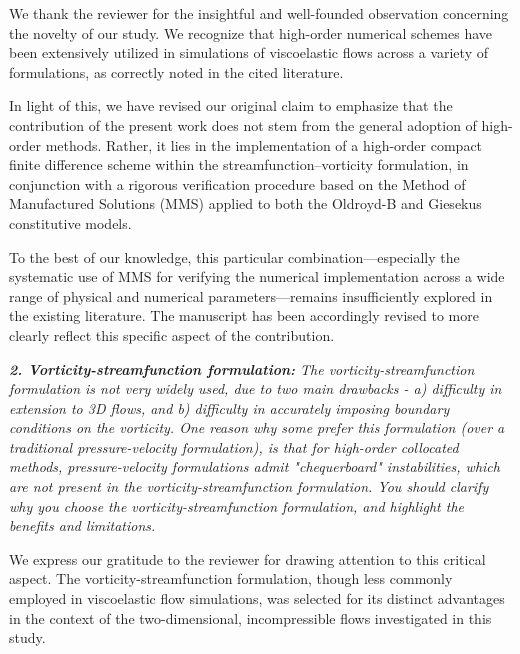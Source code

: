 \documentclass[12pt]{article}
\begin{document}
We thank the reviewer for the insightful and well-founded observation concerning the novelty of our study. We recognize that high-order numerical schemes have been extensively utilized in simulations of viscoelastic flows across a variety of formulations, as correctly noted in the cited literature.

In light of this, we have revised our original claim to emphasize that the contribution of the present work does not stem from the general adoption of high-order methods. Rather, it lies in the implementation of a high-order compact finite difference scheme within the streamfunction–vorticity formulation, in conjunction with a rigorous verification procedure based on the Method of Manufactured Solutions (MMS) applied to both the Oldroyd-B and Giesekus constitutive models.

To the best of our knowledge, this particular combination—especially the systematic use of MMS for verifying the numerical implementation across a wide range of physical and numerical parameters—remains insufficiently explored in the existing literature. The manuscript has been accordingly revised to more clearly reflect this specific aspect of the contribution.

\vspace{3mm}
{\it \textbf{2. Vorticity-streamfunction formulation:} The vorticity-streamfunction formulation is not very widely used, due to two main drawbacks - a) difficulty in extension to 3D flows, and b) difficulty in accurately imposing boundary conditions on the vorticity. One reason why some prefer this formulation (over a traditional pressure-velocity formulation), is that for high-order collocated methods, pressure-velocity formulations admit "chequerboard" instabilities, which are not present in the vorticity-streamfunction formulation. You should clarify why you choose the vorticity-streamfunction formulation, and highlight the benefits and limitations.}
\vspace{3mm}

We express our gratitude to the reviewer for drawing attention to this critical aspect. The vorticity-streamfunction formulation, though less commonly employed in viscoelastic flow simulations, was selected for its distinct advantages in the context of the two-dimensional, incompressible flows investigated in this study.
\end{document}
